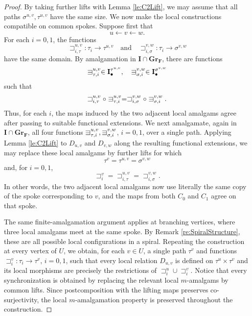 \documentclass[12pt]{amsart}
\numberwithin{equation}{section}
\theoremstyle{plain}
\theoremstyle{definition}
\newcommand{\sqni}{\mathrel{\vphantom{\sqsupset}\text{\mathsurround=0pt\ooalign{$\sqsupset$\cr$-$\cr}}}}
\newcommand \sqsp{\sqsupset}
\newcommand \la{\leftarrow}
\newcommand \GGRFb{\mathbf{Gr_F}}
\newcommand \IIb{\mathbf{I}}
\begin{document}
\begin{proof}
	By taking further lifts with Lemma \ref{le:C2Lift}, we may assume that
	all paths $\sigma^{u,v},\tau^{u,v}$ have the same size. We now make
	the local constructions compatible on common spokes. Suppose first that
	\[
	u\la v\la w.
	\]
	For each $i=0,1$, the functions
	\[
	\sqsp^{u,v}_{i,\tau}\colon \tau_i \to \tau^{u,v}
	\quad\text{and}\quad
	\sqsp^{v,w}_{i,\sigma}\colon \tau_i \to \sigma^{v,w}
	\]
	have the same domain. By amalgamation in $\IIb\cap\GGRFb$, there are
	functions
	\[
	\sqni^{u,v}_{\tau,i}\in\IIb^{\tau^{u,v}}_\bullet,
	\quad
	\sqni^{v,w}_{\sigma,i}\in\IIb^{\sigma^{v,w}}_\bullet
	\]
	such that
	\[
	\sqsp^{u,v}_{i,\tau}\circ\sqni^{u,v}_{\tau,i}
	=
	\sqsp^{v,w}_{i,\sigma}\circ\sqni^{v,w}_{\sigma,i}.
	\]
	Thus, for each $i$, the maps induced by the two adjacent local
	amalgams agree after passing to suitable functional extensions. We next amalgamate, again in $\IIb\cap\GGRFb$, all four functions $\sqni^{u,v}_{\tau,i}, \sqni^{v,w}_{\sigma,i}$, $i=0,1$,
	over a single path. Applying Lemma \ref{le:C2Lift} to
	$D_{u,v}$ and $D_{v,w}$ along the resulting functional extensions, we
	may replace these local amalgams by further lifts for which
	\[
	\tau^v=\tau^{u,v}=\sigma^{v,w}
	\]
	and, for $i=0,1$,
	\[
	\sqsp_i^v
	=
	\sqsp^{u,v}_{i,\tau}
	=
	\sqsp^{v,w}_{i,\sigma}.
	\]
	In other words, the two adjacent local amalgams now use literally the
	same copy of the spoke corresponding to $v$, and the maps from both
	$C_0$ and $C_1$ agree on that spoke.
	
	
	The same finite-amalgamation argument applies at branching vertices, where three local amalgams meet at the same spoke. By Remark \ref{re:SpiralStructure}, these are all possible local configurations
	in a spiral. Repeating the construction at every vertex of $U$, we obtain, for
	each $v\in U$, a single path $\tau^v$ and functions $\sqsp_i^v\colon \tau_i \to \tau^v$, $i=0,1$, such that every local relation $D_{u,v}$ is defined on
	$\tau^u\times\tau^v$ and its local morphisms are precisely the
	restrictions of $\sqsp_i^u\cup\sqsp_i^v$. Notice that every
	synchronization is obtained by replacing the relevant local
	$m$-amalgams by common lifts. Since postcomposition with the lifting maps preserves co-surjectivity, the local $m$-amalgamation property is preserved throughout the construction.
	

\end{proof}
\end{document}
